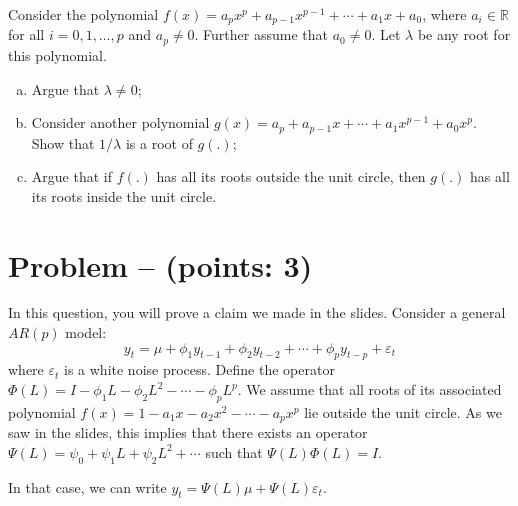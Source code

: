 \documentclass[11pt]{article}
\theoremstyle{definition}
\newcounter{problem}
\renewcommand{\theproblem}{\arabic{problem}}
\newcommand{\problem}[1]{
	\stepcounter{problem}
	\section*{Problem \theproblem{} -- (points: #1)}
}
\begin{document}
Consider the polynomial $f(x) = a_p x^p + a_{p-1} x^{p-1} + \cdots + a_1 x + a_0$, where $a_i \in \mathbb{R}$ for all $i = 0, 1, \ldots, p$ and $a_p \neq 0$. Further assume that $a_0 \neq 0$. Let $\lambda$ be any root for this polynomial.

\begin{enumerate}[a)]
	\item Argue that $\lambda \neq 0$;
	\item Consider another polynomial $g(x) = a_p + a_{p-1} x + \cdots + a_1 x^{p-1} + a_0 x^p$. Show that $1/\lambda$ is a root of $g(.)$;
	\item Argue that if $f(.)$ has all its roots outside the unit circle, then $g(.)$ has all its roots inside the unit circle.
\end{enumerate}

\problem{3}
In this question, you will prove a claim we made in the slides. Consider a general $AR(p)$ model:
\begin{equation*}
y_t = \mu + \phi_1 y_{t-1} + \phi_2 y_{t-2} + \cdots + \phi_p y_{t-p} + \varepsilon_t	
\end{equation*}
where $\varepsilon_t$ is a white noise process. Define the operator $\Phi(L) = I - \phi_1 L - \phi_2 L^2 - \cdots - \phi_p L^p$. We assume that all roots of its associated polynomial $f(x) = 1 - a_1x - a_2x^2 - \cdots - a_px^p$ lie outside the unit circle. As we saw in the slides, this implies that there exists an operator $\Psi(L) = \psi_0 + \psi_1 L + \psi_2 L^2 + \cdots$ such that $\Psi(L)\Phi(L) = I$.

In that case, we can write $y_t = \Psi(L)\mu + \Psi(L)\varepsilon_t$.
\end{document}
